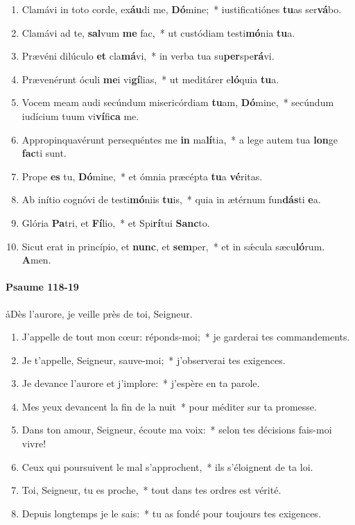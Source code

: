 \documentclass[twoside]{article}
\begin{document}
\begin{paracol}[1]{2}
\begin{enumerate}[wide, itemsep=0mm, labelwidth=!, labelindent=0pt, label=\color{gregoriocolor}\theenumi]
\item Clamávi in toto corde, ex\textbf{áu}di me, \textbf{Dó}mine;~* iustificatiónes \textbf{tu}as ser\textbf{vá}bo.
\item Clamávi ad te, \textbf{sal}vum \textbf{me} fac,~* ut custódiam testi\textbf{mó}nia \textbf{tu}a.
\item Prævéni dilúculo \textbf{et} cla\textbf{má}vi,~* in verba tua su\textbf{per}spe\textbf{rá}vi.
\item Prævenérunt óculi \textbf{me}i vi\textbf{gí}lias,~* ut meditárer e\textbf{ló}quia \textbf{tu}a.
\item Vocem meam audi secúndum misericórdiam \textbf{tu}am, \textbf{Dó}mine,~* secúndum iudícium tuum vi\textbf{ví}fi\textbf{ca} me.
\item Appropinquavérunt persequéntes me \textbf{in} ma\textbf{lí}tia,~* a lege autem tua \textbf{lon}ge \textbf{fac}ti sunt.
\item Prope \textbf{es} tu, \textbf{Dó}mine,~* et ómnia præcépta \textbf{tu}a \textbf{vé}ritas.
\item Ab inítio cognóvi de testi\textbf{mó}niis \textbf{tu}is,~* quia in ætérnum fun\textbf{dás}ti \textbf{e}a.
\item Glória \textbf{Pa}tri, et \textbf{Fí}lio,~* et Spi\textbf{rí}tui \textbf{Sanc}to.
\item Sicut erat in princípio, et \textbf{nunc}, et \textbf{sem}per,~* et in sǽcula sæcu\textbf{ló}rum. \textbf{A}men.
\end{enumerate}

\switchcolumn


\paragraph{Psaume 118-19}

\aa Dès l’aurore, je veille près de toi, Seigneur.


\begin{enumerate}[wide, itemsep=0mm, labelwidth=!, labelindent=0pt, label=\color{gregoriocolor}\theenumi]
\item J’appelle de tout mon cœur: réponds-moi;~* je garderai tes commandements.
\item Je t’appelle, Seigneur, sauve-moi;~* j’observerai tes exigences.
\item Je devance l’aurore et j’implore:~* j’espère en ta parole.
\item Mes yeux devancent la fin de la nuit~* pour méditer sur ta promesse.
\item Dans ton amour, Seigneur, écoute ma voix:~* selon tes décisions fais-moi vivre!
\item Ceux qui poursuivent le mal s’approchent,~* ils s’éloignent de ta loi.
\item Toi, Seigneur, tu es proche,~* tout dans tes ordres est vérité.
\item Depuis longtemps je le sais:~* tu as fondé pour toujours tes exigences.
\end{enumerate}
\newpage
\switchcolumn*

\end{paracol}
\end{document}
